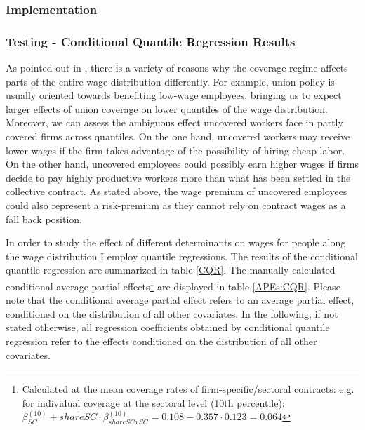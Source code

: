 \subsubsection{Implementation}

\subsubsection{Testing - Conditional Quantile Regression Results}
As pointed out in \cite{Fitzenberger&Kohn&Lembcke:13}, there is a variety of reasons why the coverage regime affects parts of the entire wage distribution differently. For example, union policy is usually oriented towards benefiting low-wage employees, bringing us to expect larger effects of union coverage on lower quantiles of the wage distribution. Moreover, we can assess the ambiguous effect uncovered workers face in partly covered firms across quantiles. On the one hand, uncovered workers may receive lower wages if the firm takes advantage of the possibility of hiring cheap labor. On the other hand, uncovered employees could possibly earn higher wages if firms decide to pay highly productive workers more than what has been settled in the collective contract. As stated above, the wage premium of uncovered employees could also represent a risk-premium as they cannot rely on contract wages as a fall back position.

In order to study the effect of different determinants on wages for people along the wage distribution I employ quantile regressions. The results of the conditional quantile regression are summarized in table \ref{CQR}. The manually calculated conditional average partial effects\footnote{ Calculated at the mean coverage rates of firm-specific/sectoral contracts: e.g. for individual coverage at the sectoral level (10th percentile): $\beta_{SC}^{(10)}+\overline{shareSC}\cdot \beta_{shareSCxSC}^{(10)}=0.108-0.357 \cdot 0.123=0.064$} are displayed in table \ref{APEs:CQR}. Please note that the conditional average partial effect refers to an average partial effect, conditioned on the distribution of all other covariates. In the following, if not stated otherwise, all regression coefficients obtained by conditional quantile regression refer to the effects conditioned on the distribution of all other covariates.

